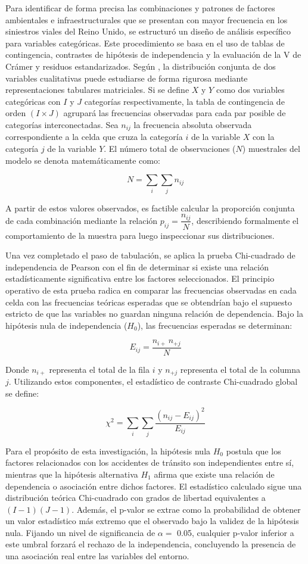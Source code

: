 \documentclass[11pt]{article}
\begin{document}
Para identificar de forma precisa las combinaciones y patrones de 
factores ambientales e infraestructurales que se presentan con mayor 
frecuencia en los siniestros viales del Reino Unido, se estructuró un diseño de 
análisis específico para variables categóricas. Este procedimiento 
se basa en el uso de tablas de contingencia, contrastes de hipótesis de 
independencia y la evaluación de la V de Crámer y residuos estandarizados. Según \textcite{LASTRE2019}, 
la distribución conjunta de dos variables cualitativas puede estudiarse de forma 
rigurosa mediante representaciones tabulares matriciales. Si se define $X$ y $Y$ como 
dos variables categóricas con $I$ y $J$ categorías respectivamente, la tabla de 
contingencia de orden $(I \times J)$ agrupará las frecuencias observadas para cada 
par posible de categorías interconectadas. Sea $n_{ij}$ la frecuencia absoluta 
observada correspondiente a la celda que cruza la categoría $i$ de la variable $X$ con 
la categoría $j$ de la variable $Y$. El número total de observaciones ($N$) muestrales del 
modelo se denota matemáticamente como:

$$
N = \sum_{i}\sum_{j} n_{ij}
$$

A partir de estos valores observados, es factible calcular 
la proporción conjunta de cada combinación mediante 
la relación $p_{ij} = \dfrac{n_{ij}}{N}$, describiendo 
formalmente el comportamiento de la muestra para luego 
inspeccionar sus distribuciones.

Una vez completado el paso de tabulación, se aplica la 
prueba Chi-cuadrado de independencia de Pearson con el fin de determinar si 
existe una relación estadísticamente significativa entre los factores seleccionados. 
El principio operativo de esta prueba radica en comparar las frecuencias observadas 
en cada celda con las frecuencias teóricas esperadas que se obtendrían bajo el supuesto 
estricto de que las variables no guardan ninguna relación de dependencia. Bajo la hipótesis 
nula de independencia ($H_0$), las frecuencias esperadas se determinan:

$$
E_{ij} = \frac{n_{i+}\, n_{+j}}{N}
$$

Donde $n_{i+}$ representa el total de la fila $i$ y $n_{+j}$ representa el total de la 
columna $j$. Utilizando estos componentes, el estadístico de contraste Chi-cuadrado global 
se define:

$$
\chi^2 = \sum_{i}\sum_{j} \frac{(n_{ij} - E_{ij})^2}{E_{ij}}
$$

Para el propósito de esta investigación, la hipótesis nula $H_0$ postula 
que los factores relacionados con los accidentes de tránsito son independientes 
entre sí, mientras que la hipótesis alternativa $H_1$ afirma que existe una relación 
de dependencia o asociación entre dichos factores. El estadístico calculado sigue una 
distribución teórica Chi-cuadrado con grados de libertad equivalentes a $(I-1)(J-1)$. Además, el p-valor 
se extrae como la probabilidad de obtener un valor estadístico más extremo que el observado 
bajo la validez de la hipótesis nula. Fijando un nivel de significancia de $\alpha =$ 0.05, 
cualquier p-valor inferior a este umbral forzará el rechazo de la independencia, concluyendo 
la presencia de una asociación real entre las variables del entorno.
\end{document}
